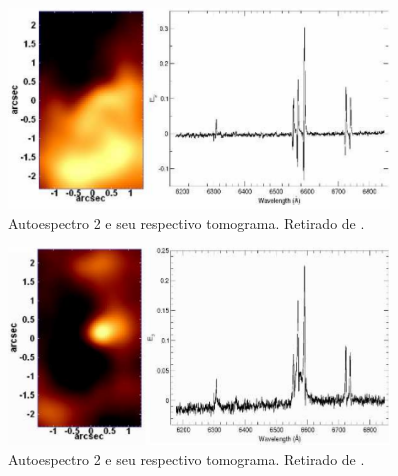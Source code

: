 \begin{figure}
    \includegraphics[width=0.9\textwidth]{figuras/figSteiner2009figA2.pdf}
    \caption[Tomograma e autoespectro 2 da galáxia NGC 4736.]
    {Autoespectro 2 e seu respectivo tomograma. Retirado de \citet[][fig.
    A2]{Steiner2009}.}
    \label{fig:TomoPCA:eigspec2}
\end{figure}

\begin{figure}
    \includegraphics[width=0.9\textwidth]{figuras/figSteiner2009figA3.pdf}
    \caption[Tomograma e autoespectro 3 da galáxia NGC 4736.]
    {Autoespectro 2 e seu respectivo tomograma. Retirado de \citet[][fig.
    A3]{Steiner2009}.}
    \label{fig:TomoPCA:eigspec3}
\end{figure}

